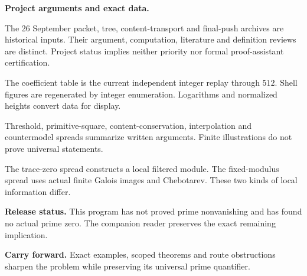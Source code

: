 \documentclass[11pt]{article}
\begin{document}
\begin{minipage}[t]{0.48\linewidth}\vspace{0pt}\small
\textbf{Project arguments and exact data.}\par
The 26 September packet, tree, content-transport and final-push archives are historical inputs. Their argument, computation, literature and definition reviews are distinct. Project status implies neither priority nor formal proof-assistant certification.\par
The coefficient table is the current independent integer replay through $512$. Shell figures are regenerated by integer enumeration. Logarithms and normalized heights convert data for display.\par
Threshold, primitive-square, content-conservation, interpolation and countermodel spreads summarize written arguments. Finite illustrations do not prove universal statements.\par
The trace-zero spread constructs a local filtered module. The fixed-modulus spread uses actual finite Galois images and Chebotarev. These two kinds of local information differ.\par
\textbf{Release status.} This program has not proved prime nonvanishing and has found no actual prime zero. The companion reader preserves the exact remaining implication.
\end{minipage}
\vfill
\colorbox{Soft}{\parbox{\dimexpr\linewidth-2\fboxsep\relax}{\small\textbf{Carry forward.} Exact examples, scoped theorems and route obstructions sharpen the problem while preserving its universal prime quantifier.}}
\end{document}
